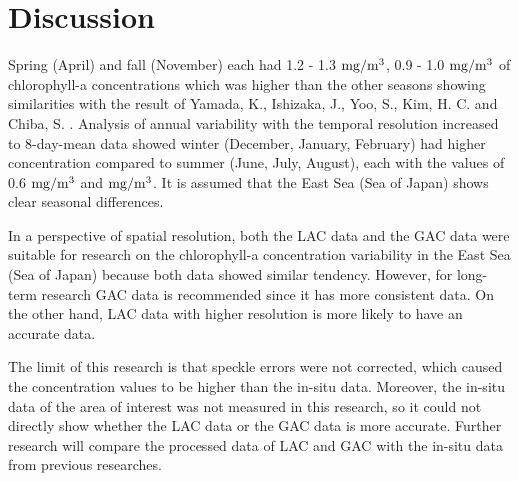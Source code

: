 \section{Discussion}
Spring (April) and fall (November) each had 1.2 - 1.3 $\rm mg/m^3$, 0.9 - 1.0 $\rm mg/m^3$ of chlorophyll-a concentrations which was higher than the other seasons showing similarities with the result of Yamada, K., Ishizaka, J., Yoo, S., Kim, H. C. and Chiba, S. \cite{yamada2004seasonal}. Analysis of annual variability with the temporal resolution increased to 8-day-mean data showed winter (December, January, February) had higher concentration compared to summer (June, July, August), each with the values of 0.6 $\rm mg/m^3$ and $\rm mg/m^3$. It is assumed that the East Sea (Sea of Japan) shows clear seasonal differences.

In a perspective of spatial resolution, both the LAC data and the GAC data were suitable for research on the chlorophyll-a concentration variability in the East Sea (Sea of Japan) because both data showed similar tendency. However, for long-term research GAC data is recommended since it has more consistent data. On the other hand, LAC data with higher resolution is more likely to have an accurate data. 

The limit of this research is that speckle errors were not corrected, which caused the concentration values to be higher than the in-situ data. Moreover, the in-situ data of the area of interest was not measured in this research, so it could not directly show whether the LAC data or the GAC data is more accurate. Further research will compare the processed data of LAC and GAC with the in-situ data from previous researches.
